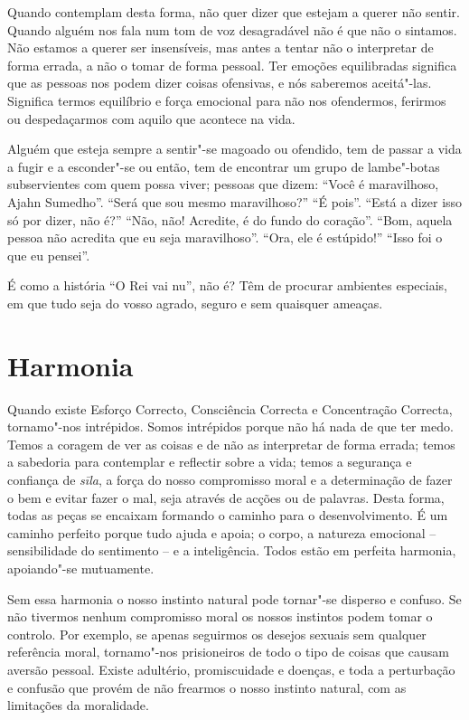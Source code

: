 Quando contemplam desta forma, não quer dizer que estejam a querer não sentir.
Quando alguém nos fala num tom de voz desagradável não é que não o sintamos. Não
estamos a querer ser insensíveis, mas antes a tentar não o interpretar de forma
errada, a não o tomar de forma pessoal. Ter emoções equilibradas significa que
as pessoas nos podem dizer coisas ofensivas, e nós saberemos aceitá"-las. Significa termos
equilíbrio e força emocional para não nos ofendermos, ferirmos ou despedaçarmos
com aquilo que acontece na vida.

Alguém que esteja sempre a sentir"-se magoado ou ofendido, tem de passar a vida a
fugir e a esconder"-se ou então, tem de encontrar um grupo de lambe"-botas
subservientes com quem possa viver; pessoas que dizem: “Você é maravilhoso,
Ajahn Sumedho”. “Será que sou mesmo maravilhoso?” “É pois”. “Está a dizer isso
só por dizer, não é?” “Não, não! Acredite, é do fundo do coração”. “Bom, aquela
pessoa não acredita que eu seja maravilhoso”. “Ora, ele é estúpido!” “Isso foi o
que eu pensei”.

É como a história “O Rei vai nu”, não é? Têm de procurar ambientes especiais, em
que tudo seja do vosso agrado, seguro e sem quaisquer ameaças.

\clearpage

\section{Harmonia}

Quando existe Esforço Correcto, Consciência Correcta e Concentração Correcta,
tornamo"-nos intrépidos. Somos intrépidos porque não há nada de que ter medo.
Temos a coragem de ver as coisas e de não as interpretar de forma errada; temos
a sabedoria para contemplar e reflectir sobre a vida; temos a segurança e
confiança de \emph{sīla}, a força do nosso compromisso moral e a determinação de
fazer o bem e evitar fazer o mal, seja através de acções ou de palavras. Desta forma,
todas as peças se encaixam formando o caminho para o desenvolvimento. É um
caminho perfeito porque tudo ajuda e apoia; o corpo, a natureza emocional –
sensibilidade do sentimento – e a inteligência. Todos estão em perfeita
harmonia, apoiando"-se mutuamente.

Sem essa harmonia o nosso instinto natural pode tornar"-se disperso e confuso. Se
não tivermos nenhum compromisso moral os nossos instintos podem tomar o
controlo. Por exemplo, se apenas seguirmos os desejos sexuais sem qualquer
referência moral, tornamo"-nos prisioneiros de todo o tipo de coisas que causam
aversão pessoal. Existe adultério, promiscuidade e doenças, e toda a perturbação
e confusão que provém de não frearmos o nosso instinto natural, com as
limitações da moralidade.


